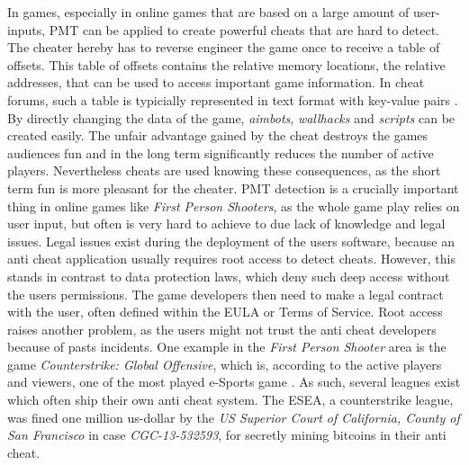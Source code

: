 In games, especially in online games that are based on a large amount of user-inputs, \gls{PMT} can be applied to create powerful cheats that are hard to detect. The cheater hereby has to reverse engineer the game once to receive a table of offsets. This table of offsets contains the relative memory locations, the relative addresses, that can be used to access important game information. In cheat forums, such a table is typicially represented in text format with key-value pairs \cite{offsets}. By directly changing the data of the game, \emph{aimbots}, \emph{wallhacks} and \emph{scripts} can be created easily. The unfair advantage gained by the cheat destroys the games audiences fun and in the long term significantly reduces the number of active players. Nevertheless cheats are used knowing these consequences, as the short term fun is more pleasant for the cheater. \gls{PMT} detection is a crucially important thing in online games like \emph{First Person Shooters}, as the whole game play relies on user input, but often is very hard to achieve to due lack of knowledge and legal issues. Legal issues exist during the deployment of the users software, because an anti cheat application usually requires root access to detect cheats. However, this stands in contrast to data protection laws, which deny such deep access without the users permissions. The game developers then need to make a legal contract with the user, often defined within the \gls{EULA} or Terms of Service. Root access raises another problem, as the users might not trust the anti cheat developers because of pasts incidents. One example in the \emph{First Person Shooter} area is the game \emph{Counterstrike: Global Offensive}, which is, according to the active players and viewers, one of the most played e-Sports game \cite{csgo1, csgo2}. As such, several leagues exist which often ship their own anti cheat system. The \gls{ESEA}, a counterstrike league, was fined one million us-dollar by the \emph{US Superior Court of California, County of San Francisco} \cite{esea} in case \emph{CGC-13-532593}, for secretly mining bitcoins in their anti cheat. 